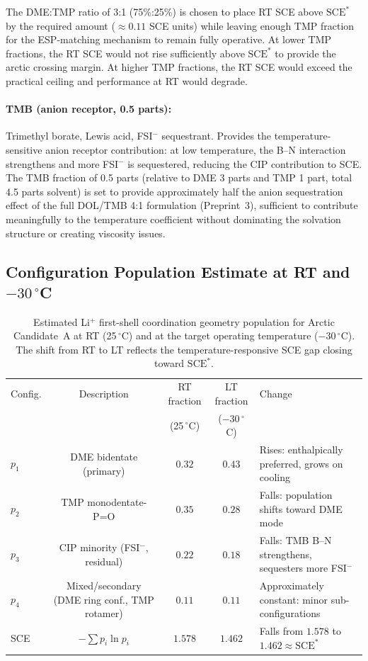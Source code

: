 \documentclass[11pt]{article}
\theoremstyle{plain}
\theoremstyle{definition}
\theoremstyle{remark}
\begin{document}
The DME:TMP ratio of 3:1 (75\%:25\%) is chosen to place RT SCE
above $\mathrm{SCE}^{*}$ by the required amount ($\approx 0.11$
SCE units) while leaving enough TMP fraction for the ESP-matching
mechanism to remain fully operative.  At lower TMP fractions,
the RT SCE would not rise sufficiently above $\mathrm{SCE}^{*}$
to provide the arctic crossing margin.  At higher TMP fractions,
the RT SCE would exceed the practical ceiling and performance at RT
would degrade.

\paragraph{TMB (anion receptor, 0.5 parts):}
Trimethyl borate, Lewis acid, FSI$^-$ sequestrant.  Provides the
temperature-sensitive anion receptor contribution: at low temperature,
the B--N interaction strengthens and more FSI$^-$ is sequestered,
reducing the CIP contribution to SCE.  The TMB fraction of 0.5
parts (relative to DME 3 parts and TMP 1 part, total 4.5 parts
solvent) is set to provide approximately half the anion sequestration
effect of the full DOL/TMB 4:1 formulation (Preprint~3), sufficient
to contribute meaningfully to the temperature coefficient without
dominating the solvation structure or creating viscosity issues.

\subsection{Configuration Population Estimate at RT and $-30\,^\circ$C}

\begin{table}[h!]
\centering
\caption{Estimated Li$^+$ first-shell coordination geometry population
for Arctic Candidate~A at RT (25\,$^\circ$C) and at the target
operating temperature ($-30\,^\circ$C).  The shift from RT to LT
reflects the temperature-responsive SCE gap closing toward
$\mathrm{SCE}^{*}$.}
\label{tab:arctic_pop}
\small
\begin{tabular}{lcccp{4.5cm}}
\toprule
Config. & Description & RT fraction & LT fraction & Change \\
        &             & (25\,$^\circ$C) & ($-30\,^\circ$C) & \\
\midrule
$p_1$ & DME bidentate (primary) &
  $0.32$ & $0.43$ &
  Rises: enthalpically preferred, grows on cooling \\[4pt]
$p_2$ & TMP monodentate-P=O &
  $0.35$ & $0.28$ &
  Falls: population shifts toward DME mode \\[4pt]
$p_3$ & CIP minority (FSI$^-$, residual) &
  $0.22$ & $0.18$ &
  Falls: TMB B--N strengthens, sequesters more FSI$^-$ \\[4pt]
$p_4$ & Mixed/secondary (DME ring conf., TMP rotamer) &
  $0.11$ & $0.11$ &
  Approximately constant: minor sub-configurations \\
\midrule
SCE & $-\sum p_i \ln p_i$ &
  $1.578$ & $1.462$ &
  Falls from $1.578$ to $1.462 \approx \mathrm{SCE}^{*}$ \\
\bottomrule
\end{tabular}
\end{table}
\end{document}
